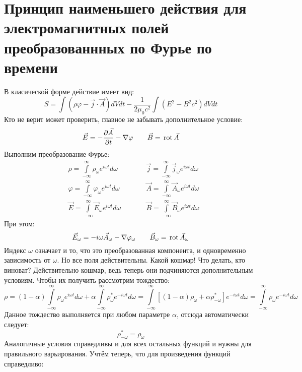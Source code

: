 \section{Принцип наименьшего действия для электромагнитных полей преобразованнных по Фурье по времени}

В класической форме действие имеет вид:
\[
	S = \int (\rho \varphi - \vec{j}\cdot\vec{A}) dV dt- \frac{1}{2\mu_0c^2} \int (E^2 - B^2 c^2) dV dt
\]
Кто не верит может проверить, главное не забывать дополнительное условие:
\[
	\vec{E} = - \frac{\partial \vec{A}}{\partial t} - \nabla \varphi
	\qquad
	\vec{B} = \,\mathrm{rot}\, \vec{A}
\]
Выполним преобразование Фурье:
\[
\begin{aligned}
	& \rho = \int\limits_{-\infty}^{\infty} \rho_\omega e^{i\omega t} d\omega \\
	& \varphi = \int\limits_{-\infty}^{\infty} \varphi_\omega e^{i\omega t} d\omega \\
	& \vec{E} = \int\limits_{-\infty}^{\infty} \vec{E}_\omega e^{i\omega t} d\omega
\end{aligned}
\qquad
\begin{aligned}
	& \vec{j} = \int\limits_{-\infty}^{\infty} \vec{j}_\omega e^{i\omega t} d\omega \\
	& \vec{A} = \int\limits_{-\infty}^{\infty} \vec{A}_\omega e^{i\omega t} d\omega \\
	& \vec{B} = \int\limits_{-\infty}^{\infty} \vec{B}_\omega e^{i\omega t} d\omega
\end{aligned}
\]
При этом:
\[
	\vec{E}_\omega = - i \omega \vec{A}_\omega - \nabla \varphi_\omega
	\qquad
	\vec{B}_\omega = \,\mathrm{rot}\, \vec{A}_\omega
\]
Индекс $\omega$ означает и то, что это преобразованная компонента, и одновременно зависимость от $\omega$. Но все поля действительны. Какой кошмар! Что делать, кто виноват? Действительно кошмар, ведь теперь они подчиняются дополнительным условиям. Чтобы их получить рассмотрим тождество:
\[
	\rho = (1 - \alpha) \int\limits_{-\infty}^{\infty} \rho_\omega e^{i\omega t} d\omega + \alpha \int\limits_{-\infty}^{\infty} \rho^*_\omega e^{- i\omega t} d\omega = 
	\int\limits_{-\infty}^{\infty} [(1 - \alpha) \rho_\omega + \alpha \rho^*_{- \omega}] e^{- i\omega t} d\omega
	= \int\limits_{-\infty}^{\infty} \rho_\omega e^{- i\omega t} d\omega
\]
Данное тождество выполняется при любом параметре $\alpha$, отсюда автоматически следует:
\[
	\rho^*_{- \omega} = \rho_{\omega}
\]
Аналогичные условия справедливы и для всех остальных функций и нужны для правильного варьирования. Учтём теперь, что для произведения функций справедливо:
